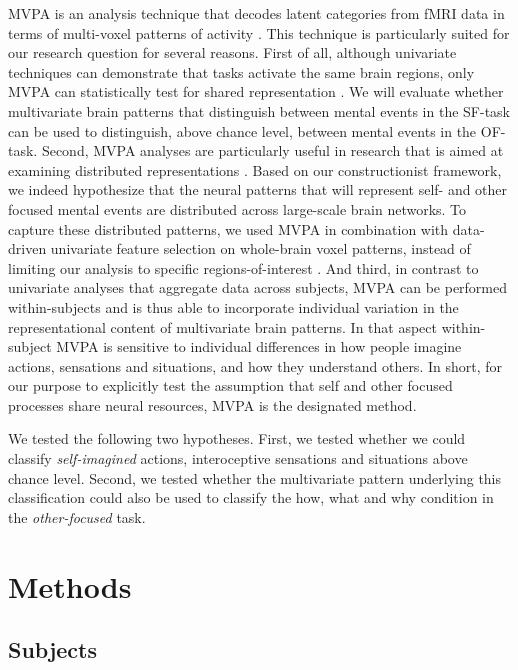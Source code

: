 \documentclass[12pt,american,a4paper,oneside,]{memoir} %
\begin{document}
MVPA is an analysis technique that decodes latent categories from fMRI data in terms of multi-voxel patterns of activity \autocite{norman2006beyond}. This technique is particularly suited for our research question for several reasons. First of all, although univariate techniques can demonstrate that tasks activate the same brain regions, only MVPA can statistically test for shared representation \autocite{lamm2015role}. We will evaluate whether multivariate brain patterns that distinguish between mental events in the SF-task can be used to distinguish, above chance level, between mental events in the OF-task. Second, MVPA analyses are particularly useful in research that is aimed at examining distributed representations \autocite{singer2012past}. Based on our constructionist framework, we indeed hypothesize that the neural patterns that will represent self- and other focused mental events are distributed across large-scale brain networks. To capture these distributed patterns, we used MVPA in combination with data-driven univariate feature selection on whole-brain voxel patterns, instead of limiting our analysis to specific regions-of-interest \autocite{haynes2015primer}. And third, in contrast to univariate analyses that aggregate data across subjects, MVPA can be performed within-subjects and is thus able to incorporate individual variation in the representational content of multivariate brain patterns. In that aspect within-subject MVPA is sensitive to individual differences in how people imagine actions, sensations and situations, and how they understand others. In short, for our purpose to explicitly test the assumption that self and other focused processes share neural resources, MVPA is the designated method.

We tested the following two hypotheses. First, we tested whether we could classify \emph{self-imagined} actions, interoceptive sensations and situations above chance level. Second, we tested whether the multivariate pattern underlying this classification could also be used to classify the how, what and why condition in the \emph{other-focused} task.

\hypertarget{Sharedstates-methods}{%
\section{Methods}\label{Sharedstates-methods}}

\hypertarget{subjects}{%
\subsection{Subjects}\label{subjects}}
\end{document}
